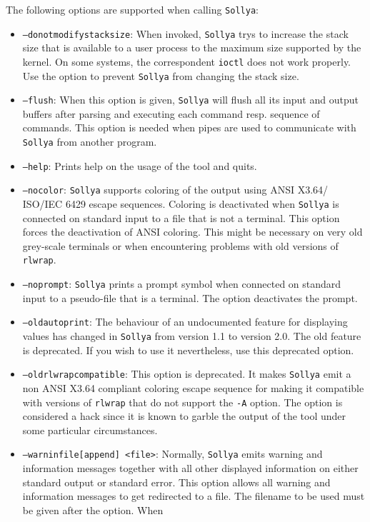 \documentclass[a4paper]{article}
\newcommand{\sollya}{\texttt{Sollya}\xspace}
\begin{document}
The following options are supported when calling \sollya:
\begin{itemize}
\item \texttt{--donotmodifystacksize}: When invoked, \sollya trys to increase
the stack size that is available to a user process to the maximum size
supported by the kernel. On some systems, the correspondent \texttt{ioctl} 
does not work properly. Use the option to prevent \sollya from changing the 
stack size.
\item \texttt{--flush}: When this option is given, \sollya will flush
all its input and output buffers after parsing and executing each
command resp. sequence of commands. This option is needed when pipes
are used to communicate with \sollya from another program.
\item \texttt{--help}: Prints help on the usage of the tool and quits.
\item \texttt{--nocolor}: \sollya supports coloring of the output
  using ANSI X3.64/ ISO/IEC 6429 escape sequences. Coloring is
  deactivated when \sollya is connected on standard input to a file
  that is not a terminal. This option forces the deactivation of ANSI
  coloring. This might be necessary on very old grey-scale terminals or when
  encountering problems with old versions of \texttt{rlwrap}. 
\item \texttt{--noprompt}: \sollya prints a prompt symbol when
  connected on standard input to a pseudo-file that is a terminal. The
  option deactivates the prompt.
\item \texttt{--oldautoprint}: The behaviour of an undocumented
feature for displaying values has changed in \sollya from version 1.1
to version 2.0. The old feature is deprecated. If you wish to use it
nevertheless, use this deprecated option.
\item \texttt{--oldrlwrapcompatible}: This option is deprecated. It
  makes \sollya emit a non ANSI X3.64 compliant coloring escape
  sequence for making it compatible with versions of \texttt{rlwrap}
  that do not support the \texttt{-A} option. The option is considered
  a hack since it is known to garble the output of the tool under
  some particular circumstances.
\item \texttt{--warninfile[append] <file>}: Normally, \sollya emits
  warning and information messages together with all other displayed
  information on either standard output or standard error. This option
  allows all warning and information messages to get redirected to a
  file. The filename to be used must be given after the option.  When

\end{itemize}
\end{document}
